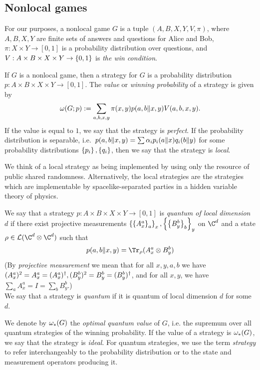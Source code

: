 \subsection{Nonlocal games}

\begin{definition}
	For our purposes, a nonlocal game $G$ is a tuple $(A,B,X,Y,V,\pi)$, where $A,B,X,Y$ are finite sets of answers and questions for Alice and Bob, $\pi:X\times Y\to [0,1]$ is a probability distribution over questions, and $V:A\times B \times X \times Y\to \left\{0,1\right\}$ is \emph{the win condition}. 
\end{definition}

\begin{definition}
	If $G$ is a nonlocal game, then a strategy for $G$ is a probability distribution $p:A\times B\times X\times Y\to [0,1]$.	The \emph{value} or \emph{winning probability} of a strategy is given by 
	\begin{equation}
		\omega(G;p) := \sum_{a,b,x,y}\pi(x,y)p(a,b\|x,y)V(a,b,x,y).
	\end{equation}
	If the value is equal to $1$, we say that the strategy is \emph{perfect}. If the probability distribution is separable, i.e.\ $p(a,b\|x,y) = \sum \alpha_i p_i(a\|x)q_i(b\|y)$ for some probability distributions $\left\{p_i\right\}, \left\{q_i\right\}$, then we say that the strategy is \emph{local}.
\end{definition}
	We think of a local strategy as being implemented by using only the resource of public shared randomness. Alternatively, the local strategies are the strategies which are implementable by spacelike-separated parties in a hidden variable theory of physics.
\begin{definition}
	We say that a strategy $p:A\times B\times X\times Y\to [0,1]$ is \emph{quantum of local dimension $d$} if there exist projective measurements $\left\{\left\{A_x^a\right\}_a\right\}_x, \left\{\left\{B_y^b\right\}_b\right\}_y$ on $\C^d$ and a state $\rho \in \m L(\C^d\otimes \C^d)$ such that 
	\begin{equation}
		p(a,b\|x,y) = \Tr_\rho(A_x^a\otimes B_y^b)
	\end{equation}
	 (By \emph{projective measurement} we mean that for all $x,y,a,b$ we have $(A_x^a)^2 = A_x^a = (A_x^a)^\dagger, (B_y^b)^2 = B^b_y= (B^b_y)^\dagger$, and for all $x,y$, we have $\sum_a A_x^a = I = \sum_bB_y^b$.)
	 \\\noindent We say that a strategy is \emph{quantum} if it is quantum of local dimension $d$ for some $d$.
\end{definition}
We denote by $\omega_*(G)$ the \emph{optimal quantum value} of $G$, i.e. the supremum over all quantum strategies of the winning probability. If the value of a strategy is $\omega_*(G)$, we say that the strategy is \emph{ideal}. For quantum strategies, we use the term \emph{strategy} to refer interchangeably to the probability distribution or to the state and measurement operators producing it. 

